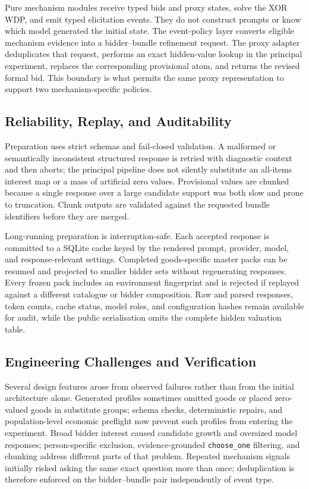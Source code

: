 Pure mechanism modules receive typed bids and proxy states, solve the XOR WDP,
and emit typed elicitation events. They do not construct prompts or know which
model generated the initial state. The event-policy layer converts eligible
mechanism evidence into a bidder--bundle refinement request. The proxy adapter
deduplicates that request, performs an exact hidden-value lookup in the
principal experiment, replaces the corresponding provisional atom, and
returns the revised formal bid. This boundary is what permits the same proxy
representation to support two mechanism-specific policies.

\subsection{Reliability, Replay, and Auditability}

Preparation uses strict schemas and fail-closed validation. A malformed or
semantically inconsistent structured response is retried with diagnostic
context and then aborts; the principal pipeline does not silently substitute
an all-items interest map or a mass of artificial zero values. Provisional
values are chunked because a single response over a large candidate support
was both slow and prone to truncation. Chunk outputs are validated against the
requested bundle identifiers before they are merged.

Long-running preparation is interruption-safe. Each accepted response is
committed to a SQLite cache keyed by the rendered prompt, provider, model, and
response-relevant settings. Completed goods-specific master packs can be
resumed and projected to smaller bidder sets without regenerating responses.
Every frozen pack includes an environment fingerprint and is rejected if
replayed against a different catalogue or bidder composition. Raw and parsed
responses, token counts, cache status, model roles, and configuration hashes
remain available for audit, while the public serialisation omits the complete
hidden valuation table.

\subsection{Engineering Challenges and Verification}

Several design features arose from observed failures rather than from the
initial architecture alone. Generated profiles sometimes omitted goods or
placed zero-valued goods in substitute groups; schema checks, deterministic
repairs, and population-level economic preflight now prevent such profiles
from entering the experiment. Broad bidder interest caused candidate growth
and oversized model responses; person-specific exclusion, evidence-grounded
\texttt{choose\_one} filtering, and chunking address different parts of that
problem. Repeated mechanism signals initially risked asking the same exact
question more than once; deduplication is therefore enforced on the
bidder--bundle pair independently of event type.

